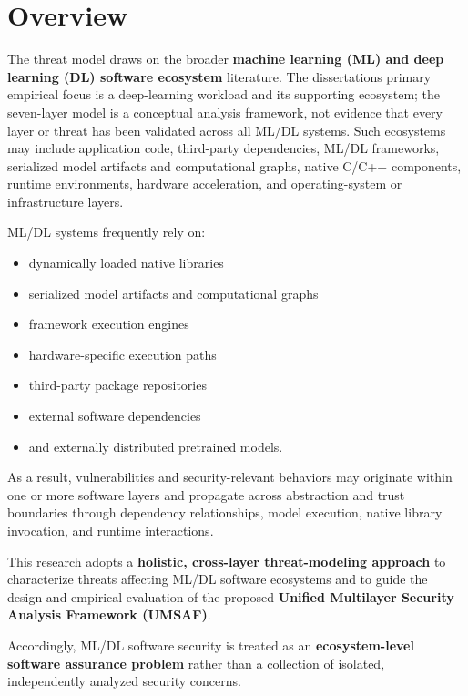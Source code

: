 \documentclass[
  12pt,
  letterpaper,
  oneside]{report}
\providecommand{\tightlist}{%
  \setlength{\itemsep}{0pt}\setlength{\parskip}{0pt}}
\begin{document}
\section{Overview}\label{61-overview}

The threat model draws on the broader \textbf{machine learning (ML) and
deep learning (DL) software ecosystem} literature. The
dissertation\textquotesingle s primary empirical focus is a
deep-learning workload and its supporting ecosystem; the seven-layer
model is a conceptual analysis framework, not evidence that every layer
or threat has been validated across all ML/DL systems. Such ecosystems
may include application code, third-party dependencies, ML/DL
frameworks, serialized model artifacts and computational graphs, native
C/C++ components, runtime environments, hardware acceleration, and
operating-system or infrastructure layers.

ML/DL systems frequently rely on:

\begin{itemize}
\tightlist
\item
  dynamically loaded native libraries
\item
  serialized model artifacts and computational graphs
\item
  framework execution engines
\item
  hardware-specific execution paths
\item
  third-party package repositories
\item
  external software dependencies
\item
  and externally distributed pretrained models.
\end{itemize}

As a result, vulnerabilities and security-relevant behaviors may
originate within one or more software layers and propagate across
abstraction and trust boundaries through dependency relationships, model
execution, native library invocation, and runtime interactions.

This research adopts a \textbf{holistic, cross-layer threat-modeling
approach} to characterize threats affecting ML/DL software ecosystems
and to guide the design and empirical evaluation of the proposed
\textbf{Unified Multilayer Security Analysis Framework (UMSAF)}.

Accordingly, ML/DL software security is treated as an
\textbf{ecosystem-level software assurance problem} rather than a
collection of isolated, independently analyzed security concerns.
\end{document}
